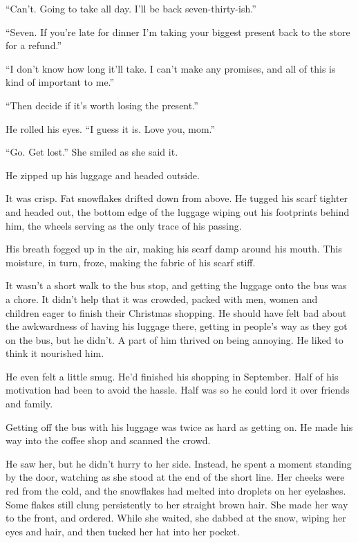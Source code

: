 ``Can't.  Going to take all day.  I'll be back seven-thirty-ish.''



``Seven.  If you're late for dinner I'm taking your biggest present back to the store for a refund.''



``I don't know how long it'll take.  I can't make any promises, and all of this is kind of important to me.''



``Then decide if it's worth losing the present.''



He rolled his eyes.  ``I guess it is.  Love you, mom.''



``Go.  Get lost.''  She smiled as she said it.



He zipped up his luggage and headed outside.



It was crisp.  Fat snowflakes drifted down from above.  He tugged his scarf tighter and headed out, the bottom edge of the luggage wiping out his footprints behind him, the wheels serving as the only trace of his passing.



His breath fogged up in the air, making his scarf damp around his mouth.  This moisture, in turn, froze, making the fabric of his scarf stiff.



It wasn't a short walk to the bus stop, and getting the luggage onto the bus was a chore.  It didn't help that it was crowded, packed with men, women and children eager to finish their Christmas shopping.  He should have felt bad about the awkwardness of having his luggage there, getting in people's way as they got on the bus, but he didn't.  A part of him thrived on being annoying.  He liked to think it nourished him.



He even felt a little smug.  He'd finished his shopping in September.  Half of his motivation had been to avoid the hassle.  Half was so he could lord it over friends and family.



Getting off the bus with his luggage was twice as hard as getting on.  He made his way into the coffee shop and scanned the crowd.



He saw her, but he didn't hurry to her side.  Instead, he spent a moment standing by the door, watching as she stood at the end of the short line.  Her cheeks were red from the cold, and the snowflakes had melted into droplets on her eyelashes.  Some flakes still clung persistently to her straight brown hair.  She made her way to the front, and ordered.  While she waited, she dabbed at the snow, wiping her eyes and hair, and then tucked her hat into her pocket.



